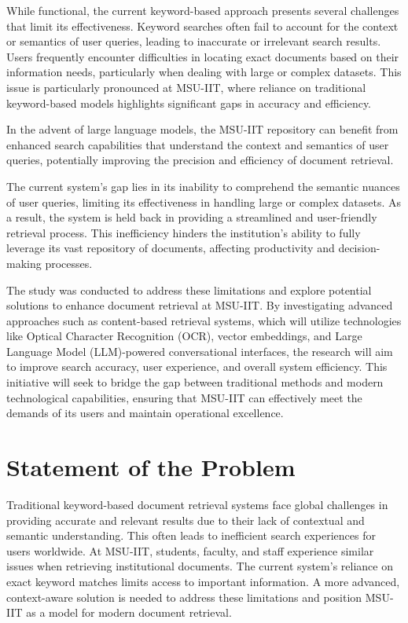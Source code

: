 While functional, the current keyword-based approach presents several challenges that limit its effectiveness. Keyword searches often fail to account for the context or semantics of user queries, leading to inaccurate or irrelevant search results. Users frequently encounter difficulties in locating exact documents based on their information needs, particularly when dealing with large or complex datasets. This issue is particularly pronounced at MSU-IIT, where reliance on traditional keyword-based models highlights significant gaps in accuracy and efficiency.

In the advent of large language models, the MSU-IIT repository can benefit from enhanced search capabilities that understand the context and semantics of user queries, potentially improving the precision and efficiency of document retrieval.

The current system's gap lies in its inability to comprehend the semantic nuances of user queries, limiting its effectiveness in handling large or complex datasets. As a result, the system is held back in providing a streamlined and user-friendly retrieval process. This inefficiency hinders the institution's ability to fully leverage its vast repository of documents, affecting productivity and decision-making processes.

The study was conducted to address these limitations and explore potential solutions to enhance document retrieval at MSU-IIT. By investigating advanced approaches such as content-based retrieval systems, which will utilize technologies like Optical Character Recognition (OCR), vector embeddings, and Large Language Model (LLM)-powered conversational interfaces, the research will aim to improve search accuracy, user experience, and overall system efficiency. This initiative will seek to bridge the gap between traditional methods and modern technological capabilities, ensuring that MSU-IIT can effectively meet the demands of its users and maintain operational excellence.

\section{Statement of the Problem}

Traditional keyword-based document retrieval systems face global challenges in providing accurate and relevant results due to their lack of contextual and semantic understanding. This often leads to inefficient search experiences for users worldwide. At MSU-IIT, students, faculty, and staff experience similar issues when retrieving institutional documents. The current system’s reliance on exact keyword matches limits access to important information. A more advanced, context-aware solution is needed to address these limitations and position MSU-IIT as a model for modern document retrieval.

